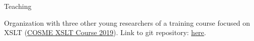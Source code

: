 \begin{rubric}{Teaching}
                                \entry*[2022-2023]
                                
                            
                    
                                \entry*
                            
                    
                                \entry*
                            
                    
                                \entry*[2021-2022]
                                
                            
                    
                                \entry*
                            
                    
                                \entry*
                            
                    
                                \entry*[2020-2021]
                                
                            
                    
                                \entry*
                            
                    
                                \entry*
                            
                    
                                \entry*
                            
                    
                                \entry*[2019-2020]
                                
                            
                    
                                \entry*
                            
                    
                                \entry*
                            
                    
                                \entry*
                            
                    
                                \entry*[2018-2019]
                                
                            Organization with three other young researchers of a training course focused
                        on XSLT (\href{https://cosme.hypotheses.org/1117}{COSME XSLT Course
                            2019}). Link to git repository: \href{https://github.com/gabays/Cours\_COSME\_2019}{here}.
                    

\end{rubric}
